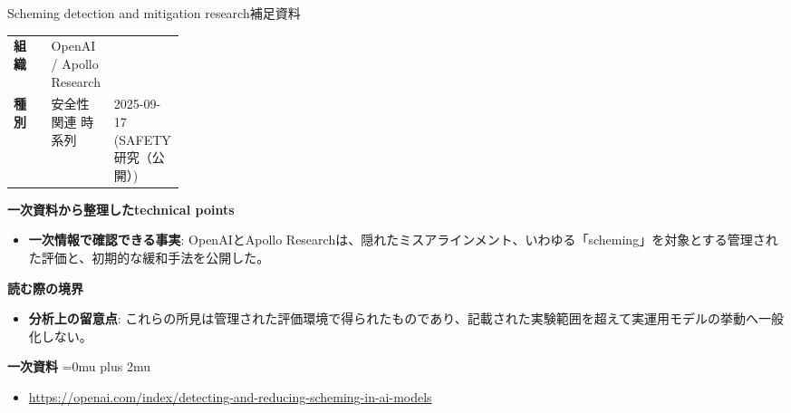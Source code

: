 \begin{technicalnote}{Scheming detection and mitigation research}{補足資料}
\begingroup
\begin{tabularx}{\linewidth}{@{}>{\bfseries}p{0.22\linewidth}X@{}}
組織 & OpenAI / Apollo Research \\
種別 & 安全性関連
時系列 & 2025-09-17 (SAFETY 研究（公開）) \\
\end{tabularx}
\smallskip
{\bfseries 一次資料から整理したtechnical points}
\begin{itemize}[leftmargin=1.5em,itemsep=0.35em]
\item \textbf{一次情報で確認できる事実}: OpenAIとApollo Researchは、隠れたミスアラインメント、いわゆる「scheming」を対象とする管理された評価と、初期的な緩和手法を公開した。
\end{itemize}
\begin{minipage}{\linewidth}
{\bfseries 読む際の境界}
\begin{itemize}[leftmargin=1.5em,itemsep=0.35em]
\item \textbf{分析上の留意点}: これらの所見は管理された評価環境で得られたものであり、記載された実験範囲を超えて実運用モデルの挙動へ一般化しない。
\end{itemize}
\begin{samepage}
{\bfseries 一次資料}
\begingroup\sloppy
\Urlmuskip=0mu plus 2mu\relax
\begin{itemize}[leftmargin=1.5em,itemsep=0.25em]
\item {\scriptsize\url{https://openai.com/index/detecting-and-reducing-scheming-in-ai-models}}
\end{itemize}
\endgroup
\end{samepage}
\end{minipage}
\endgroup
\end{technicalnote}
\medskip

